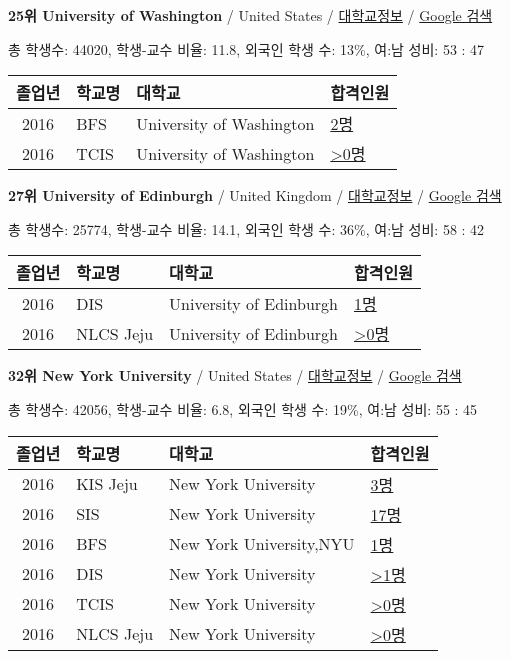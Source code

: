 \documentclass[13pt,]{article}
\begin{document}
\textbf{25위 University of Washington} / United States /
\href{https://www.timeshighereducation.com/world-university-rankings/university-of-washington?ranking-dataset=589595}{대학교정보}
/ \href{http://www.google.com/search?q=University+of+Washington}{Google
검색}

총 학생수: 44020, 학생-교수 비율: 11.8, 외국인 학생 수: 13\%, 여:남
성비: 53 : 47

\begin{longtable}[]{@{}clll@{}}
\toprule
졸업년 & 학교명 & 대학교 & 합격인원\tabularnewline
\midrule
\endhead
2016 & BFS & University of Washington &
\href{http://cafe.naver.com/assarabia/11597}{2명}\tabularnewline
2016 & TCIS & University of Washington &
\href{http://cafe.naver.com/assarabia/11598}{\textgreater{}0명}\tabularnewline
\bottomrule
\end{longtable}

\textbf{27위 University of Edinburgh} / United Kingdom /
\href{https://www.timeshighereducation.com/world-university-rankings/university-of-edinburgh?ranking-dataset=589595}{대학교정보}
/ \href{http://www.google.com/search?q=University+of+Edinburgh}{Google
검색}

총 학생수: 25774, 학생-교수 비율: 14.1, 외국인 학생 수: 36\%, 여:남
성비: 58 : 42

\begin{longtable}[]{@{}clll@{}}
\toprule
졸업년 & 학교명 & 대학교 & 합격인원\tabularnewline
\midrule
\endhead
2016 & DIS & University of Edinburgh &
\href{http://cafe.naver.com/assarabia/11591}{1명}\tabularnewline
2016 & NLCS Jeju & University of Edinburgh &
\href{http://cafe.naver.com/assarabia/11592}{\textgreater{}0명}\tabularnewline
\bottomrule
\end{longtable}

\textbf{32위 New York University} / United States /
\href{https://www.timeshighereducation.com/world-university-rankings/new-york-university?ranking-dataset=589595}{대학교정보}
/ \href{http://www.google.com/search?q=New+York+University}{Google 검색}

총 학생수: 42056, 학생-교수 비율: 6.8, 외국인 학생 수: 19\%, 여:남 성비:
55 : 45

\begin{longtable}[]{@{}clll@{}}
\toprule
졸업년 & 학교명 & 대학교 & 합격인원\tabularnewline
\midrule
\endhead
2016 & KIS Jeju & New York University &
\href{http://cafe.naver.com/assarabia/11596}{3명}\tabularnewline
2016 & SIS & New York University &
\href{http://cafe.naver.com/assarabia/11589}{17명}\tabularnewline
2016 & BFS & New York University,NYU &
\href{http://cafe.naver.com/assarabia/11597}{1명}\tabularnewline
2016 & DIS & New York University &
\href{http://cafe.naver.com/assarabia/11591}{\textgreater{}1명}\tabularnewline
2016 & TCIS & New York University &
\href{http://cafe.naver.com/assarabia/11598}{\textgreater{}0명}\tabularnewline
2016 & NLCS Jeju & New York University &
\href{http://cafe.naver.com/assarabia/11592}{\textgreater{}0명}\tabularnewline
\bottomrule
\end{longtable}
\end{document}
